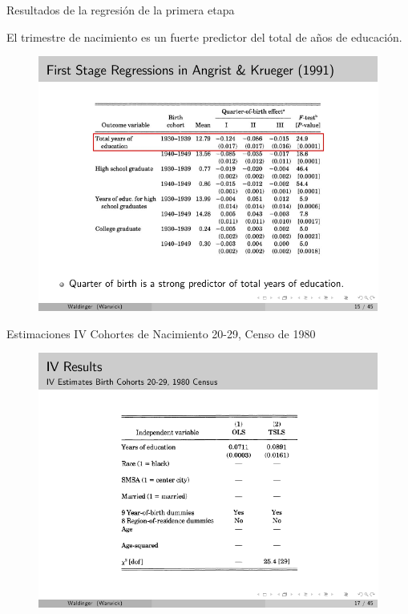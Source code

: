 \documentclass{beamer}
\begin{document}
\begin{frame}{Resultados de la regresión de la primera etapa}

	El trimestre de nacimiento es un fuerte predictor del total de años de educación.
	
	\begin{figure}
	\includegraphics{./lecture_includes/qob_5.pdf}
	\end{figure}

\end{frame}

\begin{frame}{Estimaciones IV Cohortes de Nacimiento 20-29, Censo de 1980}
	
	\begin{figure}
	\includegraphics{./lecture_includes/qob_7.pdf}
	\end{figure}
	
\end{frame}
\end{document}
